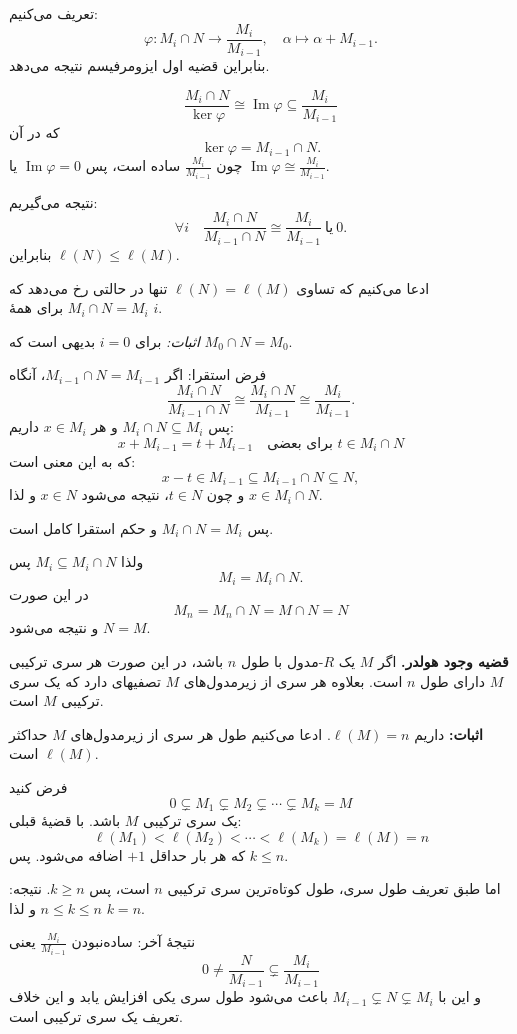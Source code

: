 تعریف می‌کنیم:
\[
    \varphi : M_i \cap N \longrightarrow \frac{M_i}{M_{i-1}},
    \quad
    \alpha \longmapsto \alpha + M_{i-1}.
\]
بنابراین قضیه اول ایزومرفیسم نتیجه می‌دهد.


\[
    \frac{M_i \cap N}{\ker \varphi} \cong \operatorname{Im} \varphi \subseteq \frac{M_i}{M_{i-1}}
\]
که در آن
\[
    \ker \varphi = M_{i-1} \cap N.
\]
چون $\frac{M_i}{M_{i-1}}$ ساده است، پس $\operatorname{Im} \varphi = 0$ یا $\operatorname{Im} \varphi \cong \frac{M_i}{M_{i-1}}$.

نتیجه می‌گیریم:
\[
    \forall i \quad \frac{M_i \cap N}{M_{i-1} \cap N} \cong \frac{M_i}{M_{i-1}} \ \text{یا} \ 0.
\]
بنابراین $\ell(N) \leq \ell(M)$.

ادعا می‌کنیم که تساوی $\ell(N) = \ell(M)$ تنها در حالتی رخ می‌دهد که $M_i \cap N = M_i$ برای همهٔ $i$.

\textit{اثبات:}
برای $i=0$ بدیهی است که $M_0 \cap N = M_0$.

فرض استقرا: اگر $M_{i-1} \cap N = M_{i-1}$، آنگاه
\[
    \frac{M_i \cap N}{M_{i-1} \cap N} \cong \frac{M_i \cap N}{M_{i-1}} \cong \frac{M_i}{M_{i-1}}.
\]
پس $M_i \cap N \subseteq M_i$ و هر $x \in M_i$ داریم:
\[
    x + M_{i-1} = t + M_{i-1} \quad \text{برای بعضی } t \in M_i \cap N
\]
که به این معنی است:
\[
    x - t \in M_{i-1} \subseteq M_{i-1} \cap N \subseteq N,
\]
و چون $t \in N$، نتیجه می‌شود $x \in N$ و لذا $x \in M_i \cap N$.

پس $M_i \cap N = M_i$ و حکم استقرا کامل است.

ولذا $M_i \subseteq M_i \cap N$ پس
\[
    M_i = M_i \cap N.
\]
در این صورت
\[
    M_n = M_n \cap N = M \cap N = N
\]
و نتیجه می‌شود $N = M$.

\textbf{قضیه وجود هولدر.}
اگر $M$ یک $R$-مدول با طول $n$ باشد، در این صورت هر سری ترکیبی $M$ دارای طول $n$ است.
بعلاوه هر سری از زیرمدول‌های $M$ تصفیهای دارد که یک سری ترکیبی $M$ است.

\textbf{اثبات:} داریم $\ell(M) = n$.
ادعا می‌کنیم طول هر سری از زیرمدول‌های $M$ حداکثر $\ell(M)$ است.

فرض کنید
\[
    0 \subsetneq M_1 \subsetneq M_2 \subsetneq \cdots \subsetneq M_k = M
\]
یک سری ترکیبی $M$ باشد. با قضیهٔ قبلی:
\[
    \ell(M_1) < \ell(M_2) < \cdots < \ell(M_k) = \ell(M) = n
\]
که هر بار حداقل $+1$ اضافه می‌شود. پس $k \leq n$.

اما طبق تعریف طول سری، طول کوتاه‌ترین سری ترکیبی $n$ است، پس $k \geq n$.
نتیجه: $n \leq k \leq n$ و لذا $k = n$.


نتیجهٔ آخر:
ساده‌نبودن $\frac{M_i}{M_{i-1}}$ یعنی
\[
    0 \neq \frac{N}{M_{i-1}} \subsetneq \frac{M_i}{M_{i-1}}
\]
و این با $M_{i-1} \subsetneq N \subsetneq M_i$ باعث می‌شود طول سری یکی افزایش یابد و این خلاف تعریف یک سری ترکیبی است.

